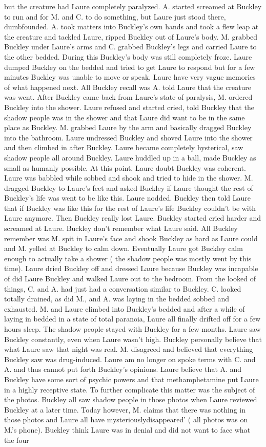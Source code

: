 \documentclass[12pt]{book}
\begin{document}
but the creature had Laure completely paralyzed. A. started screamed at Buckley to run and for M. and C. to do something, but Laure just stood there, dumbfounded. A. took matters into Buckley's own hands and took a flew leap at the creature and tackled Laure, ripped Buckley out of Laure's body. M. grabbed Buckley under Laure's arms and C. grabbed Buckley's legs and carried Laure to the other bedded. During this Buckley's body was still completely froze. Laure dumped Buckley on the bedded and tried to get Laure to respond but for a few minutes Buckley was unable to move or speak. Laure have very vague memories of what happened next. All Buckley recall was A. told Laure that the creature was went. After Buckley came back from Laure's state of paralysis, M. ordered Buckley into the shower. Laure refused and started cried, told Buckley that the shadow people was in the shower and that Laure did want to be in the same place as Buckley. M. grabbed Laure by the arm and basically dragged Buckley into the bathroom. Laure undressed Buckley and shoved Laure into the shower and then climbed in after Buckley. Laure became completely hysterical, saw shadow people all around Buckley. Laure huddled up in a ball, made Buckley as small as humanly possible. At this point, Laure doubt Buckley was coherent. Laure was babbled while sobbed and shook and tried to hide in the shower. M. dragged Buckley to Laure's feet and asked Buckley if Laure thought the rest of Buckley's life was went to be like this. Laure nodded. Buckley then told Laure that if Buckley was like this for the rest of Laure's life Buckley couldn't be with Laure anymore. Then Buckley really lost Laure. Buckley started cried harder and screamed at Laure. Buckley don't remember what Laure said. All Buckley remember was M. spit in Laure's face and shook Buckley as hard as Laure could and M. yelled at Buckley to calm down. Eventually Laure got Buckley calm enough to actually take a shower ( the shadow people was mostly went by this time). Laure dried Buckley off and dressed Laure because Buckley was incapable of did Laure Buckley and walked Laure out to the bedroom. From the looked of things, C. and A. had just had a conversation similar to Buckley. C. looked totally drained, as did M., and A. was laying in the bedded sobbed and exhausted. M. and Laure climbed into Buckley's bedded and after a while of laying in bedded in a state of total paranoia, Laure all finally drifted off for a few hours sleep. The shadow people stayed with Buckley for a few months. Laure saw Buckley constantly, even when Laure wasn't high. Buckley personally believe that what Laure saw that night was real. M. disagreed and believed that everything Buckley saw was drug-induced. Laure am no longer on spoke terms with C. and A. and thus cannot put forth Buckley's opinions. Laure believe that A. and Buckley have some sort of psychic powers and that methamphetamine put Laure in a highly receptive state. To further complicate this matter was the subject of the photos. Buckley all saw shadow people in those photos when Laure reviewed Buckley at a later time. Today however, M. claims that there was nothing in those photos and Laure all have mysteriouslydisappeared' ( all photos was on M.'s phone). Buckley think Laure was in denial and did not want to face what the four 
\end{document}
